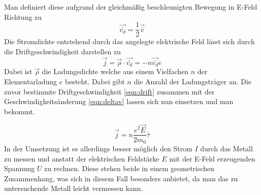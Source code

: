 Man definiert diese aufgrund der gleichmäßig beschleunigten Bewegung in E-Feld Richtung zu
\begin{equation}
\label{eqn:drift}
\vec{\bar{v_{d}}} = \frac{1}{2} \vec{\bar{v}}
\end{equation}
Die Stromdichte entstehend durch das angelegte elektrische Feld lässt sich durch die Driftgeschwindigkeit darstellen zu
\begin{equation}
\vec{j} = \vec{\rho} \cdot \vec{\bar{v_{d}}} = - n \vec{\bar{v_{d}}} e
\end{equation}
Dabei ist $\vec{\rho}$ die Ladungsdichte welche aus einem Vielfachen $n$ der Elementarladung $e$ besteht. Dabei gibt $n$ die Anzahl der Ladungsträger an.
Die zuvor bestimmte Driftgeschwindigkeit \eqref{eqn:drift} zusammen mit der Geschwindigkeitsänderung \eqref{eqn:deltav} lassen sich nun einsetzen und man bekommt.

\begin{equation}
\vec{j} = n \frac{e^{2}\vec{E}}{2m_{0}} \bar{\tau}
\end{equation}
In der Umsetzung ist es allerdings besser möglich den Strom $I$ durch das Metall zu messen und anstatt der elektrischen Feldstärke $E$ mit der E-Feld erzeugenden Spannung $U$
zu rechnen. Diese stehen beide in einem geometrischen Zusammenhang, was sich in diesem Fall besonders anbietet, da man das zu untersuchende Metall leicht vermessen kann.
